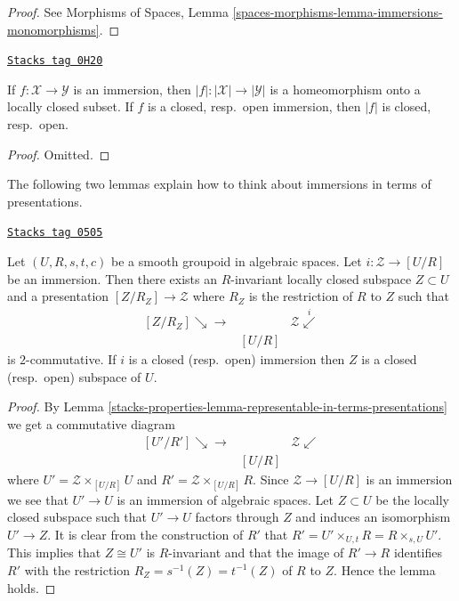 \begin{proof}
See
Morphisms of Spaces,
Lemma \ref{spaces-morphisms-lemma-immersions-monomorphisms}.
\end{proof}

\begin{lemma}
\label{stacks-properties-lemma-subspace-induced-topology}
\href{https://stacks.math.columbia.edu/tag/0H20}{\texttt{Stacks tag 0H20}}

If $f : \mathcal{X} \to \mathcal{Y}$ is an immersion, then
$|f| : |\mathcal{X}| \to |\mathcal{Y}|$ is a homeomorphism
onto a locally closed subset. If $f$ is a closed, resp.\ open
immersion, then $|f|$ is closed, resp.\ open.
\end{lemma}

\begin{proof}
Omitted.
\end{proof}

The following two lemmas explain how to think about
immersions in terms of presentations.

\begin{lemma}
\label{stacks-properties-lemma-immersion-into-presentation}
\href{https://stacks.math.columbia.edu/tag/0505}{\texttt{Stacks tag 0505}}

Let $(U, R, s, t, c)$ be a smooth groupoid in algebraic spaces.
Let $i : \mathcal{Z} \to [U/R]$ be an immersion.
Then there exists an $R$-invariant locally closed subspace
$Z \subset U$ and a presentation $[Z/R_Z] \to \mathcal{Z}$
where $R_Z$ is the restriction of $R$ to $Z$ such that
$$
\begin{array}{ccc}[Z/R_Z] \searrow\longrightarrow &  & \mathcal{Z} \overset{i}{\swarrow} \\  & [U/R] & \end{array}
$$
is $2$-commutative. If $i$ is a closed (resp.\ open) immersion
then $Z$ is a closed (resp.\ open) subspace of $U$.
\end{lemma}

\begin{proof}
By
Lemma \ref{stacks-properties-lemma-representable-in-terms-presentations}
we get a commutative diagram
$$
\begin{array}{ccc}[U'/R'] \searrow\longrightarrow &  & \mathcal{Z} \swarrow \\  & [U/R] & \end{array}
$$
where $U' = \mathcal{Z} \times_{[U/R]} U$ and
$R' = \mathcal{Z} \times_{[U/R]} R$.
Since $\mathcal{Z} \to [U/R]$ is an immersion we see that
$U' \to U$ is an immersion of algebraic spaces. Let $Z \subset U$
be the locally closed subspace such that $U' \to U$ factors through
$Z$ and induces an isomorphism $U' \to Z$.
It is clear from the construction of $R'$ that
$R' = U' \times_{U, t} R = R \times_{s, U} U'$.
This implies that $Z \cong U'$ is $R$-invariant and that the image of
$R' \to R$ identifies $R'$ with the restriction
$R_Z = s^{-1}(Z) = t^{-1}(Z)$ of $R$ to $Z$. Hence the lemma holds.
\end{proof}


